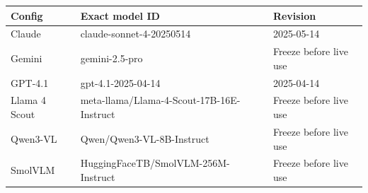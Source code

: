 \begin{tabularx}{\linewidth}{XXX}
\toprule
Config & Exact model ID & Revision\\\midrule
Claude & claude-sonnet-4-20250514 & 2025-05-14\\
Gemini & gemini-2.5-pro & Freeze before live use\\
GPT-4.1 & gpt-4.1-2025-04-14 & 2025-04-14\\
Llama 4 Scout & meta-llama/Llama-4-Scout-17B-16E-Instruct & Freeze before live use\\
Qwen3-VL & Qwen/Qwen3-VL-8B-Instruct & Freeze before live use\\
SmolVLM & HuggingFaceTB/SmolVLM-256M-Instruct & Freeze before live use\\
\bottomrule
\end{tabularx}
